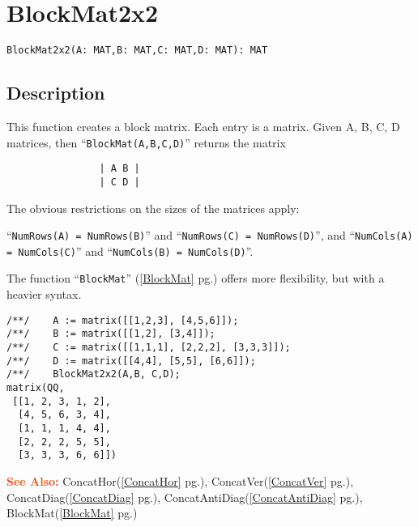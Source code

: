 \documentclass[a4paper]{mybook}
\newenvironment{command}{}{} %
\newcommand\SeeAlso{\par\textcolor{OrangeRed}{\textbf{\large See Also: }}}
\begin{document}
\section{BlockMat2x2}
\label{BlockMat2x2}
\begin{command} %


\begin{Verbatim}[label=syntax, rulecolor=\color{MidnightBlue},
frame=single]
BlockMat2x2(A: MAT,B: MAT,C: MAT,D: MAT): MAT
\end{Verbatim}


\subsection*{Description}

This function creates a block matrix.  Each entry is a matrix.
Given A, B, C, D matrices, then ``\verb&BlockMat(A,B,C,D)&'' returns the matrix
\begin{verbatim}
                | A B |
                | C D |
\end{verbatim}
The obvious restrictions on the sizes of the matrices apply:
\par 
``\verb&NumRows(A) = NumRows(B)&''  and  ``\verb&NumRows(C) = NumRows(D)&'',
and
``\verb&NumCols(A) = NumCols(C)&''  and  ``\verb&NumCols(B) = NumCols(D)&''.
\par 
The function ``\verb&BlockMat&'' (\ref{BlockMat} pg.\pageref{BlockMat}) offers more flexibility, but
with a heavier syntax.
\begin{Verbatim}[label=example, rulecolor=\color{PineGreen}, frame=single]
/**/    A := matrix([[1,2,3], [4,5,6]]);
/**/    B := matrix([[1,2], [3,4]]);
/**/    C := matrix([[1,1,1], [2,2,2], [3,3,3]]);
/**/    D := matrix([[4,4], [5,5], [6,6]]);
/**/    BlockMat2x2(A,B, C,D);
matrix(QQ,
 [[1, 2, 3, 1, 2],
  [4, 5, 6, 3, 4],
  [1, 1, 1, 4, 4],
  [2, 2, 2, 5, 5],
  [3, 3, 3, 6, 6]])
\end{Verbatim}


\SeeAlso %
  ConcatHor(\ref{ConcatHor} pg.\pageref{ConcatHor}), 
    ConcatVer(\ref{ConcatVer} pg.\pageref{ConcatVer}), 
    ConcatDiag(\ref{ConcatDiag} pg.\pageref{ConcatDiag}), 
    ConcatAntiDiag(\ref{ConcatAntiDiag} pg.\pageref{ConcatAntiDiag}), 
    BlockMat(\ref{BlockMat} pg.\pageref{BlockMat})
\end{command} %
\end{document}
